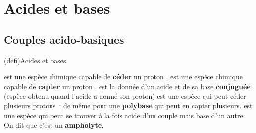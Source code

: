 \documentclass[../../main/main.tex]{subfiles}
\begin{document}
\section{Acides et bases}
\subsection{Couples acido-basiques}
\begin{tcb*}(defi){Acides et bases}
	\begin{itemize}
		 est une espèce chimique capable de \textbf{céder} un proton
		.
		 est une espèce chimique capable de \textbf{capter} un
		proton .
		 est la donnée d'un acide et de sa base
		\textbf{conjuguée} (espèce obtenu quand l'acide a donné son proton)
		 est une espèce qui peut céder plusieurs protons~;
		de même pour une \textbf{polybase} qui peut en capter plusieurs.
		 est une espèce qui peut se trouver à la fois
		acide d'un couple mais base d'un autre. On dit que c'est un
		\textbf{ampholyte}.
	\end{itemize}
\end{tcb*}
\end{document}
